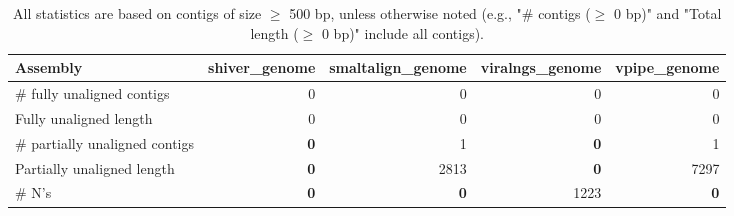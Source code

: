 \documentclass[12pt,a4paper]{article}
\begin{document}
\begin{table}[ht]
\begin{center}
\caption{All statistics are based on contigs of size $\geq$ 500 bp, unless otherwise noted (e.g., "\# contigs ($\geq$ 0 bp)" and "Total length ($\geq$ 0 bp)" include all contigs).}
\begin{tabular}{|l*{4}{|r}|}
\hline
Assembly & shiver\_genome & smaltalign\_genome & viralngs\_genome & vpipe\_genome \\ \hline
\# fully unaligned contigs & 0 & 0 & 0 & 0 \\ \hline
Fully unaligned length & 0 & 0 & 0 & 0 \\ \hline
\# partially unaligned contigs & {\bf 0} & 1 & {\bf 0} & 1 \\ \hline
Partially unaligned length & {\bf 0} & 2813 & {\bf 0} & 7297 \\ \hline
\# N's & {\bf 0} & {\bf 0} & 1223 & {\bf 0} \\ \hline
\end{tabular}
\end{center}
\end{table}
\end{document}
